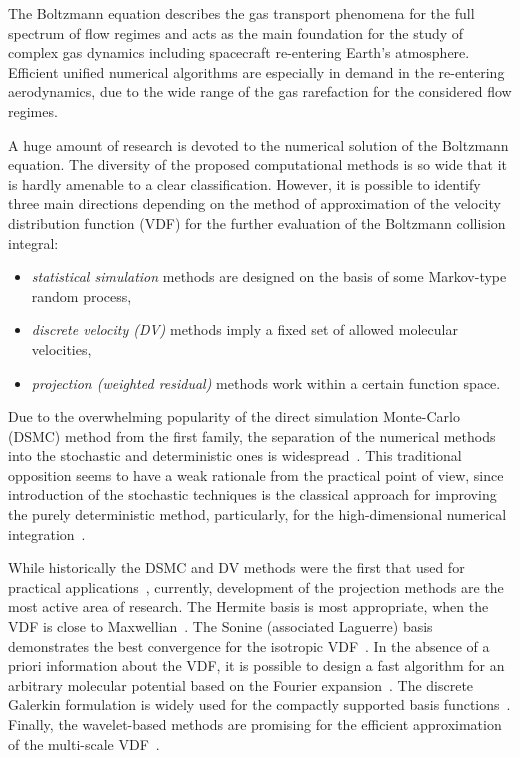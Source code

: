 \documentclass{aip-cp}
\begin{document}
The Boltzmann equation describes the gas transport phenomena for the full spectrum of flow regimes
and acts as the main foundation for the study of complex gas dynamics including spacecraft re-entering Earth’s atmosphere.
Efficient unified numerical algorithms are especially in demand in the re-entering aerodynamics,
due to the wide range of the gas rarefaction for the considered flow regimes.

A huge amount of research is devoted to the numerical solution of the Boltzmann equation.
The diversity of the proposed computational methods is so wide that it is hardly amenable to a clear classification.
However, it is possible to identify three main directions
depending on the method of approximation of the velocity distribution function (VDF)
for the further evaluation of the Boltzmann collision integral:
\begin{itemize}
    \item \emph{statistical simulation} methods are designed on the basis of some Markov-type random process,
    \item \emph{discrete velocity (DV)} methods imply a fixed set of allowed molecular velocities,
    \item \emph{projection (weighted residual)} methods work within a certain function space.
\end{itemize}
Due to the overwhelming popularity of the direct simulation Monte-Carlo (DSMC) method from the first family,
the separation of the numerical methods into the stochastic and deterministic ones is widespread~\cite{Mieussens2014}.
This traditional opposition seems to have a weak rationale from the practical point of view,
since introduction of the stochastic techniques is the classical approach for improving the purely deterministic method,
particularly, for the high-dimensional numerical integration~\cite{Dick2013}.

While historically the DSMC and DV methods were the first that used for practical applications~\cite{Bird1963, Nordsieck1966},
currently, development of the projection methods are the most active area of research.
The Hermite basis is most appropriate, when the VDF is close to Maxwellian~\cite{Gobbert2007}.
The Sonine (associated Laguerre) basis demonstrates the best convergence for the isotropic VDF~\cite{Fonn2014}.
In the absence of a priori information about the VDF,
it is possible to design a fast algorithm for an arbitrary molecular potential based on the Fourier expansion~\cite{Wu2015}.
The discrete Galerkin formulation is widely used for the compactly supported basis functions~\cite{Majorana2011, Alekseenko2014, Kitzler2015}.
Finally, the wavelet-based methods are promising for the efficient approximation of the multi-scale VDF~\cite{Tran2013}.
\end{document}

